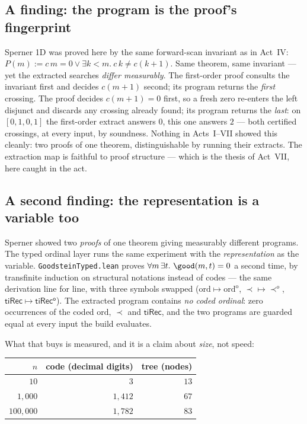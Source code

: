 \subsection*{A finding: the program is the proof's fingerprint}

Sperner 1D was proved here by the same forward-scan invariant as in Act~IV:
$P(m) := c\,m = 0 \lor \exists k{<}m.\ c\,k \neq c(k{+}1)$. Same theorem,
same invariant --- yet the extracted searches \emph{differ measurably}. The
first-order proof consults the invariant first and decides $c(m{+}1)$
second; its program returns the \emph{first} crossing. The \haomega{} proof
decides $c(m{+}1) = 0$ first, so a fresh zero re-enters the left disjunct
and discards any crossing already found; its program returns the
\emph{last}: on $[0,1,0,1]$ the first-order extract answers $0$, this one
answers $2$ --- both certified crossings, at every input, by soundness.
Nothing in Acts~I--VII showed this cleanly: two proofs of one theorem,
distinguishable by running their extracts. The extraction map is faithful
to proof structure --- which is the thesis of Act~VII, here caught in the
act.

\subsection*{A second finding: the representation is a variable too}

Sperner showed two \emph{proofs} of one theorem giving measurably different
programs. The typed ordinal layer runs the same experiment with the
\emph{representation} as the variable. \texttt{GoodsteinTyped.lean} proves
$\forall m\,\exists t.\ \good(m,t)=0$ a second time, by transfinite induction
on structural notations instead of codes --- the same derivation line for
line, with three symbols swapped ($\mathrm{ord}\mapsto\mathrm{ord^o}$,
$\prec\mapsto\prec^o$, $\mathsf{tiRec}\mapsto\mathsf{tiRec^o}$). The
extracted program contains \emph{no coded ordinal}: zero occurrences of the
coded $\mathrm{ord}$, $\prec$ and $\mathsf{tiRec}$, and the two programs are
guarded equal at every input the build evaluates.

What that buys is measured, and it is a claim about \emph{size}, not speed:

\begin{center}\small
\begin{tabular}{rrr}
\toprule
$n$ & code (decimal digits) & tree (nodes)\\
\midrule
$10$ & $3$ & $13$\\
$1{,}000$ & $1{,}412$ & $67$\\
$100{,}000$ & $1{,}782$ & $83$\\
\bottomrule
\end{tabular}
\end{center}

